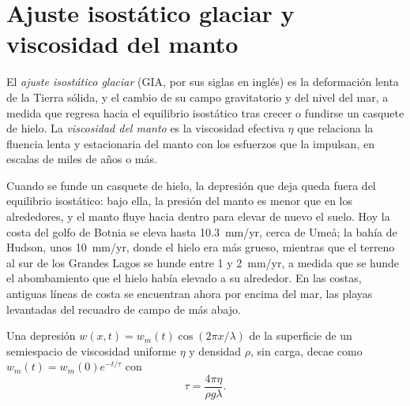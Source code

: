 \section{Ajuste isostático glaciar y viscosidad del manto}\label{sec:b3:mantle-convection:gia}

\begin{definition}\label{def:b3:mantle-convection:gia}
El \emph{ajuste isostático glaciar} (GIA, por sus siglas en inglés)
es la deformación lenta de la Tierra sólida, y el cambio de su campo gravitatorio
y del nivel del mar, a medida que regresa hacia el equilibrio isostático tras
crecer o fundirse un casquete de hielo. La \emph{viscosidad del manto}
es la viscosidad efectiva $\eta$ que relaciona la fluencia lenta y estacionaria del
manto con los esfuerzos que la impulsan, en escalas de miles de años o más.
\end{definition}

Cuando se funde un casquete de hielo, la depresión que deja queda fuera del
equilibrio isostático: bajo ella, la presión del manto es menor que en los alrededores, y
el manto fluye hacia dentro para elevar de nuevo el suelo. Hoy la costa del golfo de Botnia
se eleva hasta \qty{10.3}{mm/yr}, cerca de Umeå; la bahía de Hudson, unos
\qty{10}{mm/yr}, donde el hielo era más grueso, mientras que el terreno al sur de los Grandes
Lagos se hunde entre 1 y \qty{2}{mm/yr}, a medida que se hunde el abombamiento que el hielo había elevado
a su alrededor. En las costas, antiguas líneas de costa se encuentran ahora por encima del mar, las
playas levantadas del recuadro de campo de más abajo.

\begin{theorem}\label{thm:b3:mantle-convection:relaxation}
Una depresión $w(x, t) = w_m(t)\cos(2\pi x/\lambda)$ de la superficie de un
semiespacio de viscosidad uniforme $\eta$ y densidad $\rho$, sin carga,
decae como $w_m(t) = w_m(0)e^{-t/\tau}$ con
\[
  \tau = \frac{4\pi\eta}{\rho g\lambda} .
\]
\end{theorem}

